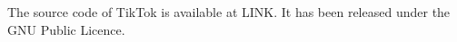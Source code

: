 The source code of TikTok is available at LINK. It has been released under the
GNU Public Licence.






